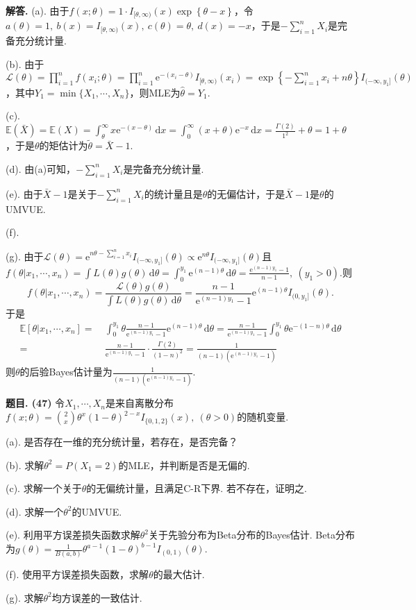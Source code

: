 \documentclass[12pt, a4paper, oneside]{ctexart}
\newcounter{problem}  %
\newenvironment{problem}[1][]{\stepcounter{problem}\par\noindent\textbf{题目\arabic{problem}. #1}}{\smallskip\par}
\newenvironment{solution}[1][]{\par\noindent\textbf{#1解答. }}{\smallskip\par}  %
\def\E{\mathbb{E}}          %
\def\d{\mathrm{d}}          %
\def\e{\mathrm{e}}          %
\def\L{\mathcal{L}}         %
\def\add{\vspace{1ex}}      %
\begin{document}
\begin{solution}
    (a). 由于$f(x;\theta) = 1\cdot I_{[\theta,\infty)}(x)\exp\left\{\theta-x\right\}$，令$a(\theta) = 1,\ b(x) = I_{[\theta,\infty)}(x),\ c(\theta)=\theta,\ d(x) = -x$，于是$-\sum_{i=1}^nX_i$是完备充分统计量.

    (b). 由于$\L(\theta) = \prod_{i=1}^nf(x_i;\theta) = \prod_{i=1}^n\e^{-(x_i-\theta)}I_{[\theta,\infty)}(x_i) = \exp\left\{-\sum_{i=1}^nx_i+n\theta\right\}I_{(-\infty,y_1]}(\theta)$，其中$Y_1 = \min\{X_1,\cdots,X_n\}$，则MLE为$\hat{\theta}=Y_1$.\add

    (c). $\E(\bar{X}) = \E(X) = \int_{\theta}^\infty x\e^{-(x-\theta)}\,\d x = \int_{0}^\infty(x+\theta)\e^{-x}\,\d x = \frac{\Gamma(2)}{1^2}+\theta = 1+\theta$，于是$\theta$的矩估计为$\tilde{\theta}=\bar{X}-1$.

    (d). 由(a)可知，$-\sum_{i=1}^nX_i$是完备充分统计量.

    (e). 由于$\bar{X}-1$是关于$-\sum_{i=1}^nX_i$的统计量且是$\theta$的无偏估计，于是$\bar{X}-1$是$\theta$的UMVUE.

    (f).

    (g). 由于$\L(\theta) = \e^{n\theta-\sum_{i=1}^nx_i}I_{(-\infty, y_1]}(\theta)\propto \e^{n\theta}I_{(-\infty,y_1]}(\theta)$且$f(\theta|x_1,\cdots, x_n) = \int L(\theta)g(\theta)\,\d\theta = \int_0^{y_1}\e^{(n-1)\theta}\,\d\theta = \frac{\e^{(n-1)y_1}-1}{n-1},\ (y_1>0)$.则
    \begin{equation*}
        f(\theta|x_1,\cdots,x_n) = \frac{\L(\theta)g(\theta)}{\int L(\theta)g(\theta)\,\d\theta} = \frac{n-1}{\e^{(n-1)y_1}-1}\e^{(n-1)\theta}I_{(0,y_1]}(\theta).
    \end{equation*}
    于是
    \begin{align*}
        \E\left[\theta|x_1,\cdots,x_n\right] =&\ \int_0^{y_1}\theta\frac{n-1}{\e^{(n-1)y_1}-1}\e^{(n-1)\theta}\,\d\theta = \frac{n-1}{\e^{(n-1)y_1}-1}\int_0^{y_1}\theta\e^{-(1-n)\theta}\,\d\theta\\
        =&\ \frac{n-1}{\e^{(n-1)y_1}-1}\cdot\frac{\Gamma(2)}{(1-n)^2} = \frac{1}{(n-1)(\e^{(n-1)y_1}-1)}
    \end{align*}
    则$\theta$的后验Bayes估计量为$\frac{1}{(n-1)(\e^{(n-1)y_1}-1)}$.
\end{solution}
\begin{problem}[(47)]
    令$X_1,\cdots,X_n$是来自离散分布$f(x;\theta) = \binom{2}{x}\theta^x(1-\theta)^{2-x}I_{\{0,1,2\}}(x),\ (\theta > 0)$的随机变量.

    (a). 是否存在一维的充分统计量，若存在，是否完备？

    (b). 求解$\theta^2 = P(X_1=2)$的MLE，并判断是否是无偏的.

    (c). 求解一个关于$\theta$的无偏统计量，且满足C-R下界. 若不存在，证明之.

    (d). 求解一个$\theta^2$的UMVUE.

    (e). 利用平方误差损失函数求解$\theta^2$关于先验分布为Beta分布的Bayes估计. Beta分布为$g(\theta) = \frac{1}{B(a,b)}\theta^{a-1}(1-\theta)^{b-1}I_{(0,1)}(\theta)$.

    (f). 使用平方误差损失函数，求解$\theta$的最大估计.

    (g). 求解$\theta^2$均方误差的一致估计.
\end{problem}
\end{document}
